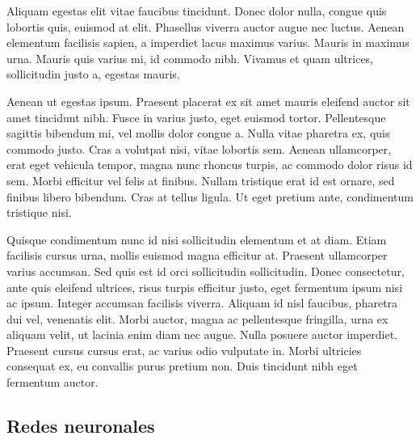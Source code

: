 Aliquam egestas elit vitae faucibus tincidunt. Donec dolor nulla, congue quis lobortis quis, euismod at elit. Phasellus viverra auctor augue nec luctus. Aenean elementum facilisis sapien, a imperdiet lacus maximus varius. Mauris in maximus urna. Mauris quis varius mi, id commodo nibh. Vivamus et quam ultrices, sollicitudin justo a, egestas mauris.

Aenean ut egestas ipsum. Praesent placerat ex sit amet mauris eleifend auctor sit amet tincidunt nibh. Fusce in varius justo, eget euismod tortor. Pellentesque sagittis bibendum mi, vel mollis dolor congue a. Nulla vitae pharetra ex, quis commodo justo. Cras a volutpat nisi, vitae lobortis sem. Aenean ullamcorper, erat eget vehicula tempor, magna nunc rhoncus turpis, ac commodo dolor risus id sem. Morbi efficitur vel felis at finibus. Nullam tristique erat id est ornare, sed finibus libero bibendum. Cras at tellus ligula. Ut eget pretium ante, condimentum tristique nisi.

Quisque condimentum nunc id nisi sollicitudin elementum et at diam. Etiam facilisis cursus urna, mollis euismod magna efficitur at. Praesent ullamcorper varius accumsan. Sed quis est id orci sollicitudin sollicitudin. Donec consectetur, ante quis eleifend ultrices, risus turpis efficitur justo, eget fermentum ipsum nisi ac ipsum. Integer accumsan facilisis viverra. Aliquam id nisl faucibus, pharetra dui vel, venenatis elit. Morbi auctor, magna ac pellentesque fringilla, urna ex aliquam velit, ut lacinia enim diam nec augue. Nulla posuere auctor imperdiet. Praesent cursus cursus erat, ac varius odio vulputate in. Morbi ultricies consequat ex, eu convallis purus pretium non. Duis tincidunt nibh eget fermentum auctor.



\newpage
\subsection{Redes neuronales}
\label{subsec:nn}


\newpage